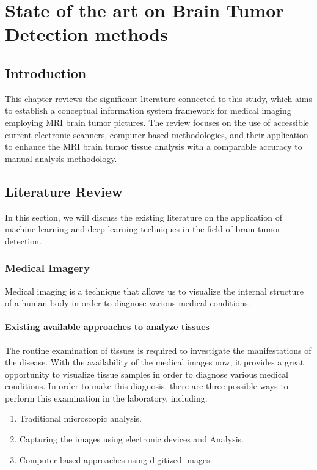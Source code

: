\chapter{State of the art on Brain Tumor Detection methods}

\section{Introduction}
This chapter reviews the significant literature connected to this study,
which aims to establish a conceptual information system framework for
medical imaging employing MRI brain tumor pictures. The review focuses on
the use of accessible current electronic scanners, computer-based
methodologies, and their application to enhance the MRI brain tumor tissue
analysis with a comparable accuracy to manual analysis methodology.

\section{Literature Review}
In this section, we will discuss the existing literature on the
application of machine learning and deep learning techniques in the field of brain tumor detection.

\subsection{Medical Imagery}
Medical imaging is a technique that allows us to visualize the internal structure of a human body in order to diagnose various medical conditions.
\subsubsection{Existing available approaches to analyze tissues}
The routine examination of tissues is required to investigate the manifestations of the disease. With the availability of the medical images now, it provides a great opportunity to visualize tissue samples in order to diagnose various medical conditions. In order to make this diagnosis, there are three possible ways to perform this examination in the laboratory, including:

\begin{enumerate}
  \item Traditional microscopic analysis.
  \item Capturing the images using electronic devices and Analysis.
  \item Computer based approaches using digitized images.
\end{enumerate}

